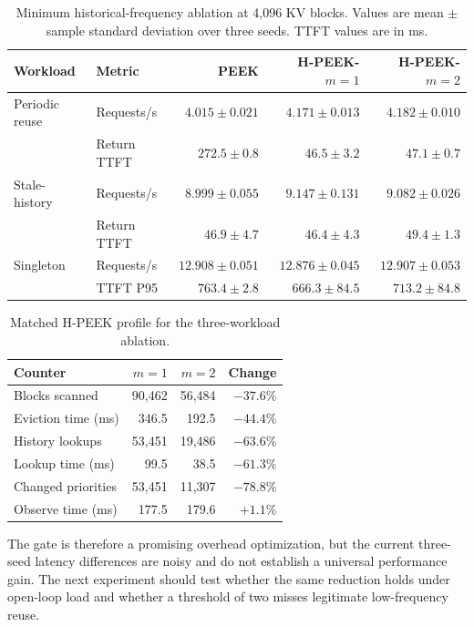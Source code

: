 \documentclass[10pt,twocolumn]{article}
\begin{document}
\begin{table}[t]
  \centering
  \small
  \caption{Minimum historical-frequency ablation at 4,096 KV blocks. Values are
  mean $\pm$ sample standard deviation over three seeds. TTFT values are in ms.}
  \label{tab:min-frequency}
  \begin{tabular}{llrrr}
    \toprule
    Workload & Metric & PEEK & H-PEEK-$m{=}1$ & H-PEEK-$m{=}2$ \\
    \midrule
    Periodic reuse & Requests/s & $4.015\pm0.021$ & $4.171\pm0.013$ & $4.182\pm0.010$ \\
                   & Return TTFT & $272.5\pm0.8$ & $46.5\pm3.2$ & $47.1\pm0.7$ \\
    Stale-history & Requests/s & $8.999\pm0.055$ & $9.147\pm0.131$ & $9.082\pm0.026$ \\
                  & Return TTFT & $46.9\pm4.7$ & $46.4\pm4.3$ & $49.4\pm1.3$ \\
    Singleton & Requests/s & $12.908\pm0.051$ & $12.876\pm0.045$ & $12.907\pm0.053$ \\
              & TTFT P95 & $763.4\pm2.8$ & $666.3\pm84.5$ & $713.2\pm84.8$ \\
    \bottomrule
  \end{tabular}
\end{table}

\begin{table}[t]
  \centering
  \caption{Matched H-PEEK profile for the three-workload ablation.}
  \label{tab:min-frequency-overhead}
  \begin{tabular}{lrrr}
    \toprule
    Counter & $m{=}1$ & $m{=}2$ & Change \\
    \midrule
    Blocks scanned & 90,462 & 56,484 & $-37.6\%$ \\
    Eviction time (ms) & 346.5 & 192.5 & $-44.4\%$ \\
    History lookups & 53,451 & 19,486 & $-63.6\%$ \\
    Lookup time (ms) & 99.5 & 38.5 & $-61.3\%$ \\
    Changed priorities & 53,451 & 11,307 & $-78.8\%$ \\
    Observe time (ms) & 177.5 & 179.6 & $+1.1\%$ \\
    \bottomrule
  \end{tabular}
\end{table}

The gate is therefore a promising overhead optimization, but the current
three-seed latency differences are noisy and do not establish a universal
performance gain. The next experiment should test whether the same reduction
holds under open-loop load and whether a threshold of two misses legitimate
low-frequency reuse.
\end{document}
